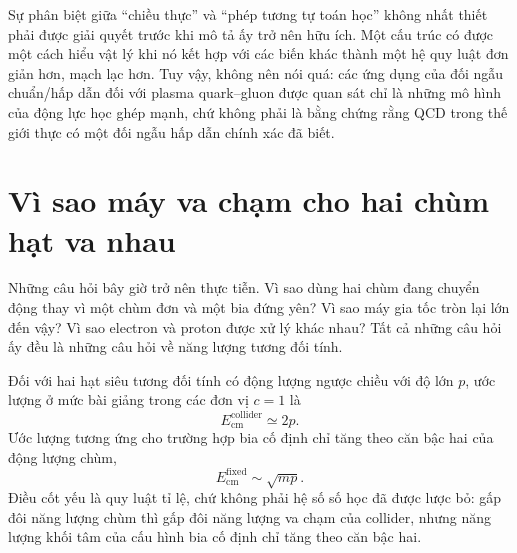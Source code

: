Sự phân biệt giữa ``chiều thực'' và ``phép tương tự toán học'' không nhất thiết phải được giải quyết trước khi mô tả ấy trở nên hữu ích. Một cấu trúc có được một cách hiểu vật lý khi nó kết hợp với các biến khác thành một hệ quy luật đơn giản hơn, mạch lạc hơn. Tuy vậy, không nên nói quá: các ứng dụng của đối ngẫu chuẩn/hấp dẫn đối với plasma quark--gluon được quan sát chỉ là những mô hình của động lực học ghép mạnh, chứ không phải là bằng chứng rằng QCD trong thế giới thực có một đối ngẫu hấp dẫn chính xác đã biết.

\section{Vì sao máy va chạm cho hai chùm hạt va nhau}

Những câu hỏi bây giờ trở nên thực tiễn. Vì sao dùng hai chùm đang chuyển động thay vì một chùm đơn và một bia đứng yên? Vì sao máy gia tốc tròn lại lớn đến vậy? Vì sao electron và proton được xử lý khác nhau? Tất cả những câu hỏi ấy đều là những câu hỏi về năng lượng tương đối tính.

\begin{classroomqa}
\end{classroomqa}

Đối với hai hạt siêu tương đối tính có động lượng ngược chiều với độ lớn \(p\), ước lượng ở mức bài giảng trong các đơn vị \(c=1\) là
\begin{equation}
E_{\mathrm{cm}}^{\mathrm{collider}}\simeq 2p.
\end{equation}
Ước lượng tương ứng cho trường hợp bia cố định chỉ tăng theo căn bậc hai của động lượng chùm,
\begin{equation}
E_{\mathrm{cm}}^{\mathrm{fixed}}\sim \sqrt{mp}.
\end{equation}
Điều cốt yếu là quy luật tỉ lệ, chứ không phải hệ số số học đã được lược bỏ: gấp đôi năng lượng chùm thì gấp đôi năng lượng va chạm của collider, nhưng năng lượng khối tâm của cấu hình bia cố định chỉ tăng theo căn bậc hai.

